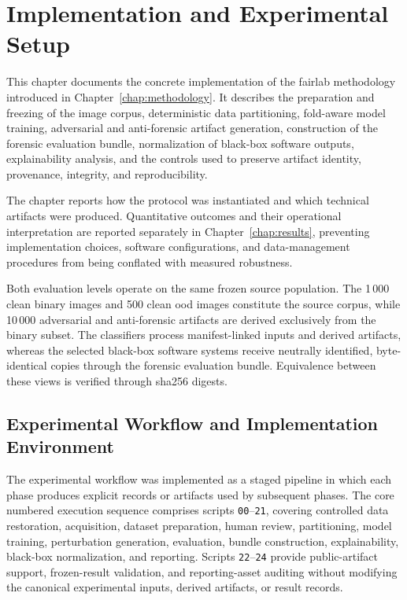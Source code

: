 \chapter{Implementation and Experimental Setup}
\label{chap:implementation}

This chapter documents the concrete implementation of the \gls{fairlab}
methodology introduced in Chapter~\ref{chap:methodology}. It describes the
preparation and freezing of the image corpus, deterministic data partitioning,
fold-aware model training, adversarial and anti-forensic artifact
generation, construction of the forensic evaluation bundle, normalization of
black-box software outputs, explainability analysis, and the controls used to
preserve artifact identity, provenance, integrity, and reproducibility.

The chapter reports how the protocol was instantiated and which technical
artifacts were produced. Quantitative outcomes and their operational
interpretation are reported separately in Chapter~\ref{chap:results}, preventing
implementation choices, software configurations, and data-management
procedures from being conflated with measured robustness.

Both evaluation levels operate on the same frozen source population. The
1\,000 clean binary images and 500 clean \gls{ood} images constitute the source
corpus, while 10\,000 adversarial and anti-forensic artifacts are derived
exclusively from the binary subset. The classifiers process manifest-linked
inputs and derived artifacts, whereas the selected black-box software systems
receive neutrally identified, byte-identical copies through the forensic
evaluation bundle. Equivalence between these views is verified through
\gls{sha256} digests.

\section{Experimental Workflow and Implementation Environment}
\label{sec:implementation-overview}

The experimental workflow was implemented as a staged pipeline in which each
phase produces explicit records or artifacts used by subsequent phases. The
core numbered execution sequence comprises scripts \texttt{00}--\texttt{21},
covering controlled data restoration, acquisition, dataset preparation, human
review, partitioning, model training, perturbation generation, evaluation,
bundle construction, explainability, black-box normalization, and reporting.
Scripts \texttt{22}--\texttt{24} provide public-artifact support, frozen-result
validation, and reporting-asset auditing without modifying the canonical
experimental inputs, derived artifacts, or result records.

